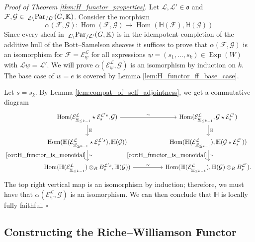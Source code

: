\documentclass{amsart}
\newcommand{\K}{\mathbb{K}}
\renewcommand{\H}{\mathbb{H}}
\newcommand{\scrF}{\mathcal{F}}
\newcommand{\scrG}{\mathcal{G}}
\newcommand{\scrE}{\mathcal{E}}
\newcommand{\scrL}{\mathcal{L}}
\DeclareMathOperator{\Hom}{Hom}
\newcommand{\fr}[1]{\mathfrak{#1}}
\newcommand{\PEE}[2]{\:_{#1 \backslash} \textnormal{Par}_{/ #2} }
\DeclareMathOperator{\Exp}{Exp}
\newcommand{\uw}{\underline{w}}
\theoremstyle{definition}
\newenvironment{midsecproof}[1]{\vspace{\topsep} \noindent \textit{Proof of #1.}}{\hfill $\square$}
\numberwithin{equation}{subsection}
\begin{document}
\begin{midsecproof}{Theorem \ref{thm:H_functor_properties}}
  Let $\scrL, \scrL' \in \fr{o}$ and $\scrF, \scrG \in \PEE{\scrL}{\scrL'} (G, \K)$.
  Consider the morphism
  \[\alpha (\scrF, \scrG) : \Hom (\scrF, \scrG) \to \Hom (\H (\scrF), \H (\scrG))\]
  Since every sheaf in $\PEE{\scrL}{\scrL'} (G, \K)$ is in the idempotent completion of the additive hull of the Bott--Samelson sheaves it suffices to
  prove that $\alpha
  (\scrF, \scrG)$ is an isomorphism for $\scrF = \scrE_{\uw}^{\scrL}$ for all expressions $\uw = (s_1, \ldots, s_k) \in \Exp (W)$ with $\scrL \uw = \scrL'$.
  We will prove $\alpha (\scrE_{\uw}^{\scrL}, \scrG)$ is an isomorphism by induction on $k$. The base case of $w = e$ is covered by Lemma
  \ref{lem:H_functor_ff_base_case}.

  Let $s = s_k$.
  By Lemma \ref{lem:compat_of_self_adjointness}, we get a commutative diagram
  \begin{equation}
    \begin{tikzcd}
      {\Hom (\scrE_{\uw_{\leq k-1}}^{\scrL} \star \scrE_s^{\scrL' s}, \scrG)} \arrow[rr, "\sim"] \arrow[d, "{\H}"] &  & {\Hom (\scrE_{\uw_{\leq k-1}}^{\scrL}, \scrG \star \scrE_s^{\scrL' })} \arrow[d, "{\H}"] \\
      {\Hom (\H (\scrE_{\uw_{\leq k-1}}^{\scrL} \star \scrE_s^{\scrL' s}), \H (\scrG))} \arrow[d, "\sim", "\ref{cor:H_functor_is_monoidal}"'] &  & {\Hom (\H (\scrE_{\uw_{\leq k-1}}^{\scrL} ), \H (\scrG \star \scrE_s^{\scrL'}) )} \arrow[d, "\sim", "\ref{cor:H_functor_is_monoidal}"'] \\
      {\Hom (\H (\scrE_{\uw_{\leq k-1}}^{\scrL}) \otimes_R B_s^{\scrL' s}, \H (\scrG))} \arrow[rr, "\sim"] &  & {\Hom (\H (\scrE_{\uw_{\leq k-1}}^{\scrL}) , \H (\scrG) \otimes_R B_s^{\scrL'})}.
    \end{tikzcd}
  \end{equation}
  The top right vertical map is an isomorphism by induction; therefore, we must have that $\alpha (\scrE_{\uw}^{\scrL}, \scrG)$
  is an isomorphism. We can then conclude that $\H$ is locally fully faithful.
\end{midsecproof}

\subsection{Constructing the Riche--Williamson Functor}
\end{document}
